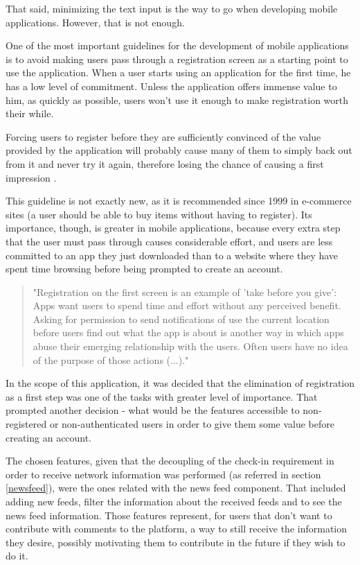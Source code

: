That said, minimizing the text input is the way to go when developing mobile applications. However, that is not enough.

One of the most important guidelines for the development of mobile applications is to avoid making users pass through a registration screen as a starting point to use the application. 
When a user starts using an application for the first time, he has a low level of commitment. Unless the application offers immense value to him, as quickly as possible, users won't use it enough to make registration worth their while. 

Forcing users to register before they are sufficiently convinced of the value provided by the application will probably cause many of them to simply back out from it and never try it again, therefore losing the chance of causing a first impression \cite{kn:NB12}.

This guideline is not exactly new, as it is recommended since 1999 in e-commerce sites (a user should be able to buy items without having to register). Its importance, though, is greater in mobile applications, because every extra step that the user must pass through causes considerable effort, and users are less committed to an app they just downloaded than to a website where they have spent time browsing before being prompted to create an account.

\begin{quote}
"Registration on the first screen is an example of 'take before you give': Apps want users to spend time and effort without any perceived benefit. Asking for permission to send notifications of use the current location before users find out what the app is about is another way in which apps abuse their emerging relationship with the users. Often users have no idea of the purpose of those actions (...)." \cite{kn:NB12}
\end{quote}


In the scope of this application, it was decided that the elimination of registration as a first step was one of the tasks with greater level of importance. That prompted another decision - what would be the features accessible to non-registered or non-authenticated users in order to give them some value before creating an account. 

The chosen features, given that the decoupling of the check-in requirement in order to receive network information was performed (as referred in section \ref{newsfeed}), were the ones related with the news feed component. That included adding new feeds, filter the information about the received feeds and to see the news feed information. 
Those features represent, for users that don't want to contribute with comments to the platform, a way to still receive the information they desire, possibly motivating them to contribute in the future if they wish to do it.

